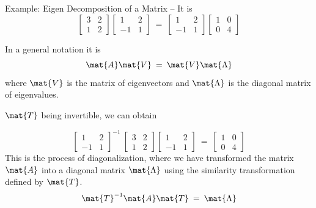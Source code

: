 \begin{frame}{Example: Eigen Decomposition of a Matrix --}
    It is
    \begin{equation*}
        \begin{bmatrix}
            3 & 2 \\
            1 & 2
        \end{bmatrix}
        \begin{bmatrix}
            1  & 2 \\
            -1 & 1
        \end{bmatrix}\:=\:
        \begin{bmatrix}
            1  & 2 \\
            -1 & 1
        \end{bmatrix}
        \begin{bmatrix}
            1 & 0 \\
            0 & 4
        \end{bmatrix}
    \end{equation*}

    In a general notation it is
    \begin{equation*}
        \mat{A}\mat{V}\:=\:\mat{V}\mat{\Lambda}
    \end{equation*}
    \medskip
    where $\mat{V}$ is the matrix of eigenvectors and $\mat{\Lambda}$ is the diagonal matrix of eigenvalues.


    $\mat{T}$ being invertible, we can obtain

    \begin{equation*}
        \begin{bmatrix}
            1  & 2 \\
            -1 & 1
        \end{bmatrix}^{-1}\:
        \begin{bmatrix}
            3 & 2 \\
            1 & 2
        \end{bmatrix}
        \begin{bmatrix}
            1  & 2 \\
            -1 & 1
        \end{bmatrix}\:=\:
        \begin{bmatrix}
            1 & 0 \\
            0 & 4
        \end{bmatrix}
    \end{equation*}
    This is the process of diagonalization, where we have transformed the matrix $\mat{A}$ into a diagonal matrix $\mat{\Lambda}$ using the similarity transformation defined by $\mat{T}$.
    \begin{equation*}
        \mat{T}^{-1}\mat{A}\mat{T}\:=\:\mat{\Lambda}
    \end{equation*}
    \vfill



\end{frame}
